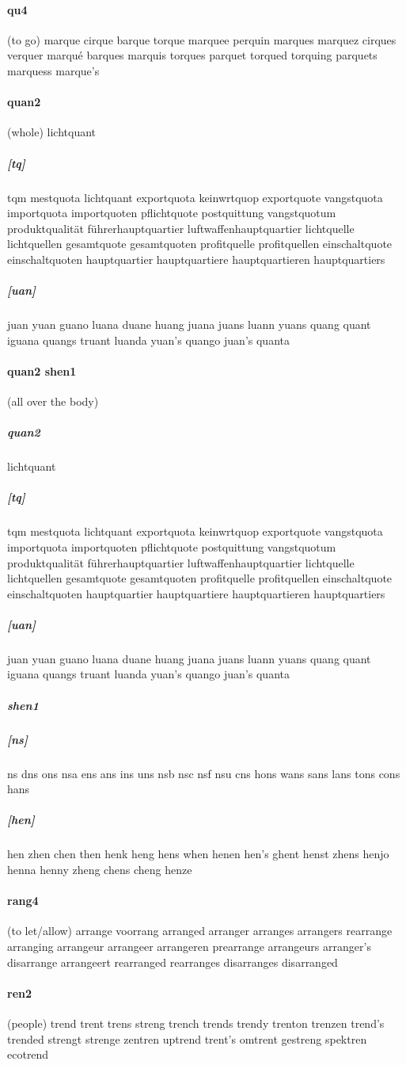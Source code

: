 \documentclass{article}
\begin{document}
\paragraph{qu4}(to go) marque
cirque
barque
torque
marquee
perquin
marques
marquez
cirques
verquer
marqué
barques
marquis
torques
parquet
torqued
torquing
parquets
marquess
marque's
\paragraph{quan2}(whole) lichtquant
\subparagraph{[tq]}tqm
mestquota
lichtquant
exportquota
keinwrtquop
exportquote
vangstquota
importquota
importquoten
pflichtquote
postquittung
vangstquotum
produktqualität
führerhauptquartier
luftwaffenhauptquartier
lichtquelle lichtquellen
gesamtquote gesamtquoten
profitquelle profitquellen
einschaltquote einschaltquoten
hauptquartier hauptquartiere hauptquartieren hauptquartiers
\subparagraph{[uan]}juan
yuan
guano
luana
duane
huang
juana
juans
luann
yuans
quang
quant
iguana
quangs
truant
luanda
yuan's
quango
juan's
quanta
\paragraph{quan2 shen1}(all over the body) \subparagraph{quan2}lichtquant
\subparagraph{[tq]}tqm
mestquota
lichtquant
exportquota
keinwrtquop
exportquote
vangstquota
importquota
importquoten
pflichtquote
postquittung
vangstquotum
produktqualität
führerhauptquartier
luftwaffenhauptquartier
lichtquelle lichtquellen
gesamtquote gesamtquoten
profitquelle profitquellen
einschaltquote einschaltquoten
hauptquartier hauptquartiere hauptquartieren hauptquartiers
\subparagraph{[uan]}juan
yuan
guano
luana
duane
huang
juana
juans
luann
yuans
quang
quant
iguana
quangs
truant
luanda
yuan's
quango
juan's
quanta
\subparagraph{shen1}\subparagraph{[ns]}ns
dns
ons
nsa
ens
ans
ins
uns
nsb
nsc
nsf
nsu
cns
hons
wans
sans
lans
tons
cons
hans
\subparagraph{[hen]}hen
zhen
chen
then
henk
heng
hens
when
henen
hen's
ghent
henst
zhens
henjo
henna
henny
zheng
chens
cheng
henze
\paragraph{rang4}(to let/allow) arrange
voorrang
arranged
arranger
arranges
arrangers
rearrange
arranging
arrangeur
arrangeer
arrangeren
prearrange
arrangeurs
arranger's
disarrange
arrangeert
rearranged
rearranges
disarranges
disarranged
\paragraph{ren2}(people) trend
trent
trens
streng
trench
trends
trendy
trenton
trenzen
trend's
trended
strengt
strenge
zentren
uptrend
trent's
omtrent
gestreng
spektren
ecotrend
\end{document}
